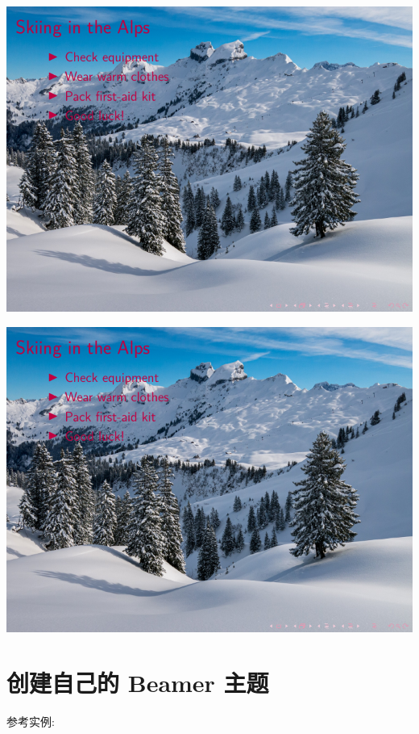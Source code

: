 \begin{column}{0.5\textwidth}
\includegraphics[page=1]{examples/beamer/beamertheme12.pdf}

\includegraphics[page=2]{examples/beamer/beamertheme12.pdf}

\section{创建自己的 Beamer 主题}

参考实例:


\end{column}
